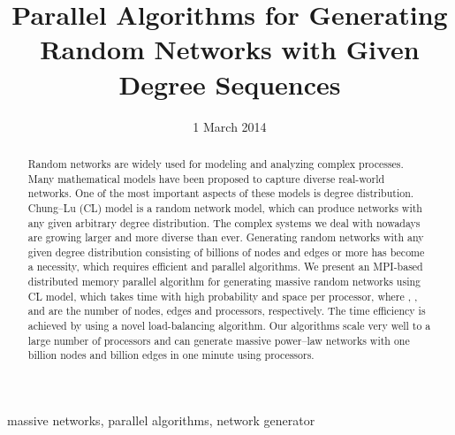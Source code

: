 \documentclass[conference,letterpaper,10pt]{IEEEtran}
\begin{document}
\title{Parallel Algorithms for Generating Random Networks with Given Degree Sequences}

\author{
}

\date{1 March 2014}

\maketitle

\begin{abstract}
Random networks are widely used for modeling and analyzing complex processes. 
Many mathematical models have been proposed to capture diverse real-world networks. 
One of the most important aspects of these models is degree distribution. 
Chung--Lu (CL) model is a random network model, which can produce networks with any given arbitrary degree distribution. 
The complex systems we deal with nowadays are growing larger and more diverse than ever.
Generating random networks with any given degree distribution consisting of billions of nodes and edges or more has become a necessity, which requires efficient and parallel algorithms. 
We present an MPI-based distributed memory parallel algorithm for generating massive random networks using CL model, which takes  time with high probability and  space per processor, where , , and  are the number of nodes, edges and processors, respectively. The time efficiency is achieved by using a novel load-balancing algorithm. Our algorithms scale very well to a large number of processors and can generate massive power--law networks with one billion nodes and  billion edges in one minute using  processors.
\end{abstract}

\begin{IEEEkeywords}
massive networks, parallel algorithms, network generator
\end{IEEEkeywords}
\end{document}
